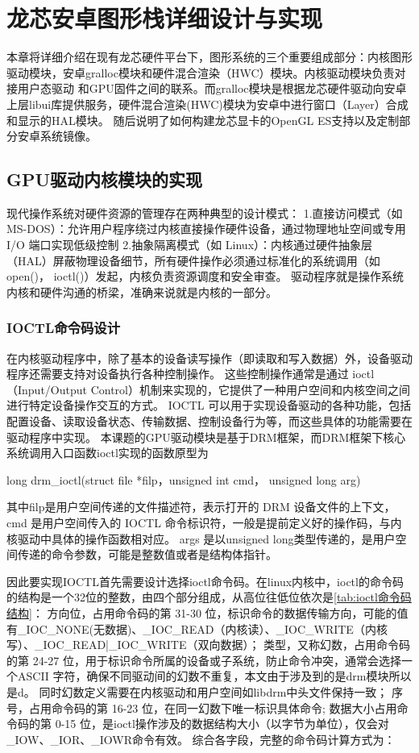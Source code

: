 
\chapter{龙芯安卓图形栈详细设计与实现}
本章将详细介绍在现有龙芯硬件平台下，图形系统的三个重要组成部分：内核图形驱动模块，安卓gralloc模块和硬件混合渲染（HWC）模块。内核驱动模块负责对接用户态驱动
和GPU固件之间的联系。而gralloc模块是根据龙芯硬件驱动向安卓上层libui库提供服务，硬件混合渲染(HWC)模块为安卓中进行窗口（Layer）合成和显示的HAL模块。
随后说明了如何构建龙芯显卡的OpenGL ES支持以及定制部分安卓系统镜像。

\section{GPU驱动内核模块的实现}
现代操作系统对硬件资源的管理存在两种典型的设计模式\cite{马超2015linux}：
1.直接访问模式​（如 MS-DOS）：允许用户程序绕过内核直接操作硬件设备，通过物理地址空间或专用 I/O 端口实现低级控制
2.抽象隔离模式​（如 Linux）：内核通过硬件抽象层（HAL）屏蔽物理设备细节，所有硬件操作必须通过标准化的系统调用\cite{刘大同2016vxworks}（如 open()， ioctl()）发起，内核负责资源调度和安全审查。
驱动程序就是操作系统内核和硬件沟通的桥梁，准确来说就是内核的一部分。

\subsection{IOCTL命令码设计}
\label{sec:IOCTL命令码设计}
在内核驱动程序中，除了基本的设备读写操作（即读取和写入数据）外，设备驱动程序还需要支持对设备执行各种控制操作。
这些控制操作通常是通过 ioctl（Input/Output Control）机制来实现的，它提供了一种用户空间和内核空间之间进行特定设备操作交互的方式。
IOCTL 可以用于实现设备驱动的各种功能，包括配置设备、读取设备状态、传输数据、控制设备行为等，而这些具体的功能需要在驱动程序中实现。
本课题的GPU驱动模块是基于DRM框架，而DRM框架下核心系统调用入口函数ioctl实现的函数原型为

long drm\_ioctl(struct file *filp，unsigned int cmd， unsigned long arg)

其中filp是用户空间传递的文件描述符，表示打开的 DRM 设备文件的上下文，cmd 是用户空间传入的 IOCTL 命令标识符，一般是提前定义好的操作码，与内核驱动中具体的操作函数相对应。
args 是以unsigned long类型传递的，是用户空间传递的命令参数，可能是整数值或者是结构体指针。

因此要实现IOCTL首先需要设计选择ioctl命令码。在linux内核中，ioctl的命令码的结构是一个32位的整数，由四个部分组成，从高位往低位依次是\ref{tab:ioctl命令码结构}：
方向位，占用命令码的第 ​31-30 位​，标识命令的数据传输方向，可能的值有\_IOC\_NONE(无数据)、\_IOC\_READ（内核读）、\_IOC\_WRITE（内核写）、\_IOC\_READ|\_IOC\_WRITE（双向数据）；
类型，又称幻数，占用命令码的第 ​24-27 位，用于标识命令所属的设备或子系统，防止命令冲突，通常会选择一个ASCII 字符，确保不同驱动间的幻数不重复，本文由于涉及到的是drm模块所以是d。
同时幻数定义需要在内核驱动和用户空间如libdrm中头文件保持一致；
序号，占用命令码的第 ​16-23 位，在同一幻数下唯一标识具体命令;
数据大小占用命令码的第 ​0-15 位，是ioctl操作涉及的数据结构大小（以字节为单位），仅会对\_IOW、\_IOR、\_IOWR命令有效。
综合各字段，完整的命令码计算方式为：

